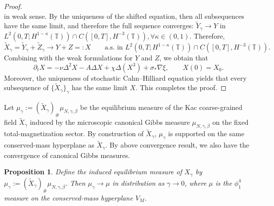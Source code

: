 \documentclass{article}
\newtheorem{proposition}[theorem]{Proposition}
\begin{document}
\begin{proof}
\[\]
in weak sense.
By the uniqueness of the shifted equation, then all subsequences have the same limit, and therefore the full sequence converges:
\(
\widetilde Y_\gamma\rightarrow Y
\)
in
\(
L^2(0,T; H^{1-\kappa}(\mathbb T))\cap C([0,T],H^{-3}(\mathbb T)), \forall \kappa \in (0,1).
\)
Therefore,
\[
\widetilde X_\gamma=\widetilde Y_\gamma+\widetilde Z_\gamma
\rightarrow
Y+Z=:X \qquad \text{a.s. in } L^2(0,T; H^{1-\kappa}(\mathbb T))\cap C([0,T],H^{-3}(\mathbb T)).
\]
Combining with the weak formulations for \(Y\) and \(Z\), we obtain that
\[
\partial_tX = -\nu \Delta^2X- A\Delta X+ \chi \Delta(X^3)
 + \sigma_* \nabla \xi,
\qquad
X(0)=X_0.
\]
Moreover, the uniqueness of stochastic Cahn--Hilliard equation yields that every subsequence of \(\{\widetilde X_\gamma\}_\gamma\) has the same limit \(X\).
This completes the proof.
\end{proof}

Let \(
\mu_\gamma:=(\widetilde X_\gamma)_\#\mu_{N,\gamma,\beta}
\)
be the equilibrium measure of the Kac coarse-grained field $\widetilde X_\gamma$ induced by the microscopic canonical Gibbs measure $\mu_{N,\gamma,\beta}$ on the fixed total-magnetization sector. By construction of \(\widetilde X_{\gamma}\), \(\mu_\gamma\) is supported on the same conserved-mass hyperplane as \(\widetilde X_\gamma\).
By above convergence result, we also have the convergence of canonical Gibbs measures.

\begin{proposition}\label{prop:induced-gibbs-measure-Xgamma}
Define the induced equilibrium measure of \(X_\gamma\) by
\(
\mu_\gamma
:=
(\widetilde X_\gamma)_\#\mu_{N,\gamma,\beta}.
\)
Then $\mu_\gamma\rightarrow \mu$ in distribution
as $\gamma \to 0$, where \(\mu\) is the $\phi^4_1$ measure on the conserved-mass hyperplane \( V_M \).
\end{proposition}
\end{document}
